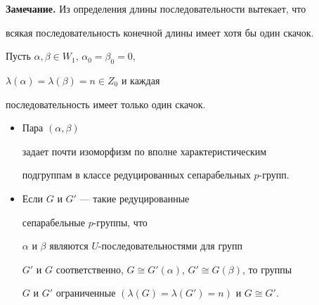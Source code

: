 {\bf Замечание.} Из определения длины последовательности вытекает, что


всякая последовательность конечной длины имеет хотя бы один скачок.





\begin{thms}


Пусть $\alpha,\beta\in W_1$, $\alpha_0=\beta_0=0$,


$\lambda(\alpha)=\lambda(\beta)=n\in Z_0$ и каждая


последовательность имеет только один скачок.


\begin{itemize}


\item[1)] Пара $(\alpha,\beta)$


задает почти изоморфизм по вполне характеристическим


подгруппам в классе редуцированных сепарабельных $p$-групп.


\item[2)] Если $G$ и $G'$ --- такие редуцированные


сепарабельные $p$-группы, что


$\alpha$ и $\beta$ являются $U$-последовательностями для групп


$G'$ и $G$ соответственно, $G\cong G'(\alpha)$, $G'\cong G(\beta)$, то группы


$G$ и $G'$ ограниченные $(\lambda(G)=\lambda(G')=n)$ и $G\cong G'$.


\end{itemize}


\end{thms}





